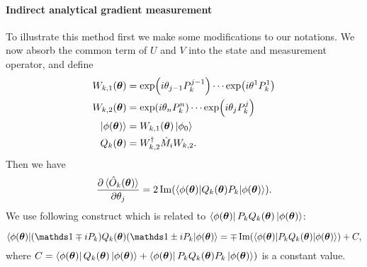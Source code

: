 \paragraph{Indirect analytical gradient measurement} 

To illustrate this method first we make some modifications to our notations. We now absorb the common term of $U$ and $V$ into the state and measurement operator, and define
\begin{equation}
\begin{split}
    W_{k,1}(\boldsymbol{\theta}) &= \exp(i \theta_{j-1} P^{j-1}_{k}) \cdots  \exp(i \theta^{1} P^{1}_{k}) \\
    W_{k,2}(\boldsymbol{\theta}) &= \exp(i \theta_{n} P^{n}_k) \cdots \exp(i \theta_{j} P^{j}_{k}) \\
    \ket{\phi(\boldsymbol{\theta})} &= W_{k,1}(\boldsymbol{\theta})\ket{\phi_0} \\
    Q_k(\boldsymbol{\theta}) &=  W_{k,2}^\dag \hat{M}_i  W_{k,2}.
\end{split}
\end{equation}
Then we have 
\begin{equation}
    \frac{\partial \braket{\hat{O}_k(\boldsymbol{\theta})}}{\partial \theta_j} = 2 \operatorname{Im} (\langle \phi(\boldsymbol{\theta})| Q_k(\boldsymbol{\theta}) P_{k} |\phi(\boldsymbol{\theta})\rangle).
\end{equation}
We use following construct which is related to $\bra{\phi(\boldsymbol{\theta})}P_kQ_k(\boldsymbol{\theta})\ket{\phi(\boldsymbol{\theta})}$:

\begin{equation}
    \langle \phi(\boldsymbol{\theta})| (\unit \mp i P_{k})Q_k(\boldsymbol{\theta})(\unit \pm i P_{k} |\phi(\boldsymbol{\theta})\rangle  = \mp  \operatorname{Im} (\langle \phi(\boldsymbol{\theta})| P_{k}Q_k(\boldsymbol{\theta}) |\phi(\boldsymbol{\theta})\rangle) + C,
\end{equation}
where $C = \bra{\phi(\boldsymbol{\theta})}    Q_k(\boldsymbol{\theta})  \ket{\phi(\boldsymbol{\theta})} +  \bra{\phi(\boldsymbol{\theta})} P_k Q_k(\boldsymbol{\theta})P_k   \ket{\phi(\boldsymbol{\theta})})$ is a constant value.

